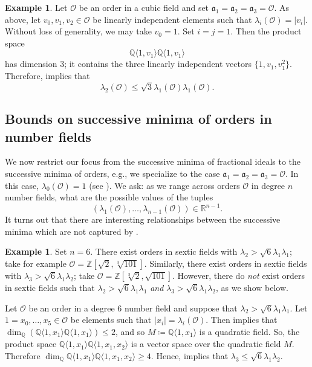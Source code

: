 \documentclass[letterpaper,10pt]{amsart}
\newcommand{\ZZ}{\mathbb{Z}}      %
\newcommand{\QQ}{\mathbb{Q}}      %
\newcommand{\RR}{\mathbb{R}}      %
\newcommand{\cO}{\mathcal{O}}      %
\newcommand{\mfa}{\mathfrak{a}}
\newcommand{\la}{\langle}
\newcommand{\ra}{\rangle}
\theoremstyle{definition}
\newtheorem{example}[theorem]{Example}
\theoremstyle{remark}
\begin{document}
\begin{example}
Let $\cO$ be an order in a cubic field and set $\mfa_1 = \mfa_2 = \mfa_3 = \cO$. As above, let $v_0,v_1,v_2 \in \cO$ be linearly independent elements such that $\lambda_i(\cO) = \lvert v_i \rvert$. Without loss of generality, we may take $v_0 = 1$. Set $i = j = 1$. Then the product space
\[
    \QQ \langle 1,v_1\rangle\QQ \langle 1,v_1\rangle
\]
has dimension $3$; it contains the three linearly independent vectors $\{1,v_1,v_1^2\}$. Therefore,  implies that
\[
    \lambda_2(\cO) \leq \sqrt{3} \lambda_1(\cO)\lambda_1(\cO). 
\]
\end{example}

\subsection{Bounds on successive minima of orders in number fields}

We now restrict our focus from the successive minima of fractional ideals to the successive minima of orders, e.g., we specialize to the case $\mfa_1 = \mfa_2 = \mfa_3 = \cO$. In this case, $\lambda_0(\cO) = 1$ (see ). We ask: as we range across orders $\cO$ in degree $n$ number fields, what are the possible values of the tuples
\[
    (\lambda_1(\cO),\dots,\lambda_{n-1}(\cO)) \in \RR^{n-1}.
\]
It turns out that there are interesting relationships between the successive minima which are not captured by .

\begin{example}
\label{ex:6}
Set $n = 6$. There exist orders in sextic fields with $\lambda_2 > \sqrt{6}\lambda_1\lambda_1$; take for example $\cO = \ZZ[\sqrt{2},\sqrt[3]{101}]$. Similarly, there exist orders in sextic fields with $\lambda_3 > \sqrt{6}\lambda_1\lambda_2$; take $\cO = \ZZ[\sqrt[3]{2},\sqrt{101}]$. However, there do \emph{not} exist orders in sextic fields such that $\lambda_2 > \sqrt{6}\lambda_1\lambda_1$ \emph{and} $\lambda_3 > \sqrt{6}\lambda_1\lambda_2$, as we show below.


Let $\cO$ be an order in a degree $6$ number field and suppose that $\lambda_2 > \sqrt{6}\lambda_1\lambda_1$. Let $1=x_0,\dots,x_5 \in \cO$ be elements such that $\lvert x_i\rvert = \lambda_i(\cO)$. Then  implies that $\dim_{\QQ}(\QQ \la 1,x_1\ra \QQ \la 1,x_1\ra) \leq 2$, and so $M \coloneqq \QQ \la 1,x_1\ra$ is a quadratic field. So, the product space $\QQ \la 1,x_1\ra \QQ \la 1,x_1,x_2\ra$ is a vector space over the quadratic field $M$. Therefore $\dim_{\QQ}\QQ \la 1,x_1\ra \QQ \la 1,x_1,x_2\ra \geq 4$. Hence,  implies that $\lambda_3 \leq \sqrt{6}\lambda_1 \lambda_2$.
\end{example}
\end{document}
